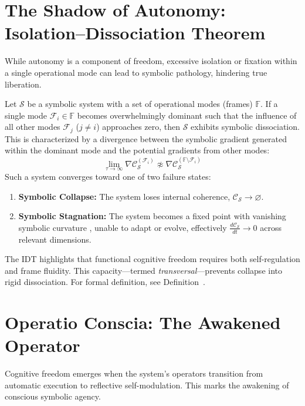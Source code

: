 \section{The Shadow of Autonomy: Isolation–Dissociation Theorem}
\label{sec:bk9_shadow_of_autonomy}
While autonomy is a component of freedom, excessive isolation or fixation within a single operational mode can lead to symbolic pathology, hindering true liberation.
\begin{theorem}
\label{theorem:bk9_isolation_dissociation_theorem}
Let $\mathcal{S}$ be a symbolic system with a set of operational modes (frames) $\mathbb{F}$. If a single mode $\mathcal{F}_i \in \mathbb{F}$ becomes overwhelmingly dominant such that the influence of all other modes $\mathcal{F}_j$ ($j \ne i$) approaches zero, then $\mathcal{S}$ exhibits symbolic dissociation. This is characterized by a divergence between the symbolic gradient generated within the dominant mode and the potential gradients from other modes:
\[
\lim_{\tau \to \infty} \nabla \mathcal{C}_{\mathcal{S}}^{(\mathcal{F}_i)} \not\approx \nabla \mathcal{C}_{\mathcal{S}}^{(\mathbb{F} \setminus \mathcal{F}_i)}
\]
Such a system converges toward one of two failure states:
\begin{enumerate}
    \item \textbf{Symbolic Collapse:} The system loses internal coherence, $\mathcal{C}_{\mathcal{S}} \to \varnothing$.
    \item \textbf{Symbolic Stagnation:} The system becomes a fixed point with vanishing symbolic curvature
\label{axiom:bk9_reflection_curvature_coherence}, unable to adapt or evolve, effectively $\frac{d\mathcal{C}_{\mathcal{S}}}{dt} \to 0$ across relevant dimensions.
\end{enumerate}
\end{theorem}
\begin{remark}[Transversal]
\label{remark:bk9_transversal}
The IDT highlights that functional cognitive freedom  
requires both self-regulation and frame fluidity.
This capacity—termed \emph{transversal}—prevents collapse into rigid dissociation.
For formal definition, see Definition~.
\end{remark}
\section{Operatio Conscia: The Awakened Operator}
\label{sec:bk9_operatio_conscia}
Cognitive freedom emerges when the system's operators transition from automatic execution to reflective self-modulation. This marks the awakening of conscious symbolic agency.
